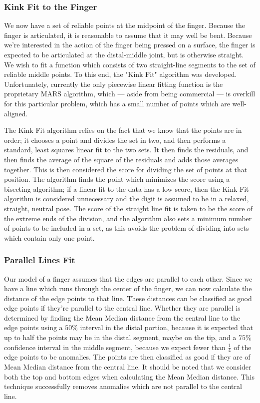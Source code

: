 \subsubsection{Kink Fit to the Finger}\label{sec:KinkFitToTheFinger}
We now have a set of reliable points at the midpoint of the finger. Because the finger is articulated, it is reasonable to assume that it may well be bent. Because we're interested in the action of the finger being pressed on a surface, the finger is expected to be articulated at the distal-middle joint, but is otherwise straight. We wish to fit a function which consists of two straight-line segments to the set of reliable middle points. To this end, the "Kink Fit" algorithm was developed. Unfortunately, currently the only piecewise linear fitting function is the proprietary MARS algorithm, which --- aside from being commercial --- is overkill for this particular problem, which has a small number of points which are well-aligned. 

The Kink Fit algorithm relies on the fact that we know that the points are in order; it chooses a point and divides the set in two, and then performs a standard, least squares linear fit to the two sets. It then finds the residuals, and then finds the average of the square of the residuals and adds those averages together. This is then considered the score for dividing the set of points at that position. The algorithm finds the point which minimizes the score using a bisecting algorithm; if a linear fit to the data has a low score, then the Kink Fit algorithm is considered unnecessary and the digit is assumed to be in a relaxed, straight, neutral pose. The score of the straight line fit is taken to be the score of the extreme ends of the division, and the algorithm also sets a minimum number of points to be included in a set, as this avoids the problem of dividing into sets which contain only one point.


\subsubsection{Parallel Lines Fit}\label{sec:ParallelLinesFit}
Our model of a finger assumes that the edges are parallel to each other. Since we have a line which runs through the center of the finger, we can now calculate the distance of the edge points to that line. These distances can be classified as good edge points if they're parallel to the central line. Whether they are parallel is determined by finding the Mean Median distance from the central line to the edge points using a $50\%$ interval in the distal portion, because it is expected that up to half the points may be in the distal segment, maybe on the tip, and a $75\%$ confidence interval in the middle segment, because we expect fewer than $\frac{1}{4}$ of the edge points to be anomalies. The points are then classified as good if they are of Mean Median distance from the central line. It should be noted that we consider both the top and bottom edges when calculating the Mean Median distance. This technique successfully removes anomalies which are not parallel to the central line.

